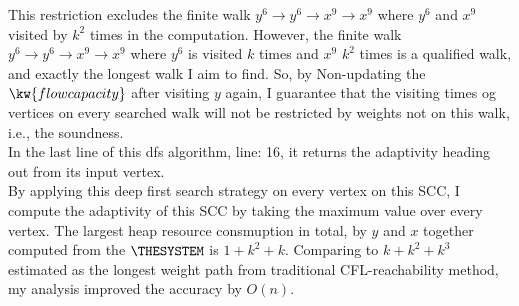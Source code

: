 \begin{example}
This restriction excludes the finite walk $y^6 \to y^6 \to x^9 \to x^9$ where $y^6$ and $x^9$ visited by $k^2$ times
in the computation. 
However, the finite walk $y^6 \to y^6 \to x^9 \to x^9$ where $y^6$ is visited $k$ times and $x^9$ $k^2$ times is 
a qualified walk, and exactly the longest walk I aim to find. So, by Non-updating the $\kw{flowcapacity}$ after 
visiting $y$ again, I guarantee that the visiting times og vertices on every searched walk will not be restricted by weights not on this walk,
i.e., the soundness.
\\
In the last line of this dfs algorithm, line: 16, it returns the adaptivity heading out from its input vertex.
\\
By applying this deep first search strategy on every vertex on this SCC, 
I compute the adaptivity of this SCC by taking the maximum 
value over every vertex.
%
The largest heap resource consmuption in total, by $y$ and $x$ together computed from the $\THESYSTEM$ is $1 + k^2 + k$.
Comparing to $k + k^2 + k^3$ estimated as  the longest weight path from traditional CFL-reachability method, 
my analysis improved the accuracy by $O(n)$.


\end{example}
